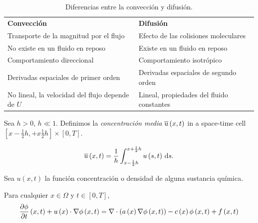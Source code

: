 \begin{table}[ht!]
	\centering
	\begin{tabular}{ll}
		\textbf{Convección}                              &
		\textbf{Difusión}                                  \\
		Transporte de la magnitud por el flujo           &
		Efecto de las colisiones moleculares               \\
		\hline
		No existe en un fluido en reposo                 &
		Existe en un fluido en reposo                      \\
		\hline
		Comportamiento direccional                       &
		Comportamiento isotrópico                          \\
		\hline
		Derivadas espaciales de primer orden             &
		Derivadas espaciales de segundo orden              \\
		\hline
		No lineal, la velocidad del flujo depende de $U$ &
		Lineal, propiedades del fluido constantes
	\end{tabular}
	\caption[short]{Diferencias entre la convección y difusión.}
\end{table}

\begin{definition}
	Sea $h>0$, $h\ll 1$.
	Definimos la \emph{concentración media}
	\begin{math}
		\overline{u}\left(x,t\right)
	\end{math}
	in a space-time cell
	\begin{math}
		\left[
			x-\frac{1}{2}h,
			+x\frac{1}{2}h
			\right]
		\times
		\left[
			0,T
			\right]
	\end{math}.

	\begin{equation*}
		\averageconcentration=
		\dfrac{1}{h}
		\int_{x-\frac{1}{2}h}^{x+\frac{1}{2}h}
		u
		\left(
		s,t
		\right)
		\dl s.
	\end{equation*}
\end{definition}

Sea
\begin{math}
	u\left(x,t\right)
\end{math}
la función concentración o densidad de alguna sustancia química.

\begin{definition}
	Para cualquier $x\in\Omega$ y $t\in\left[0,T\right]$,
	\begin{equation}\label{eq:advecion-difussion-reaction}
		\diffp{\phi}{t}\left(x,t\right)+
		u\left(x\right)\cdot
		\nabla\phi\left(x,t\right)=
		\nabla\cdot\left(a\left(x\right)\nabla\phi\left(x,t\right)\right)-
		c\left(x\right)\phi\left(x,t\right)
		+f\left(x,t\right)
	\end{equation}
\end{definition}

